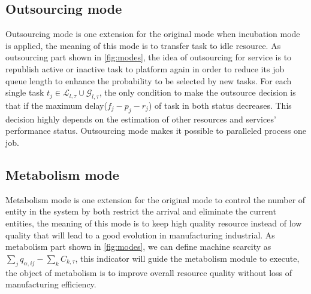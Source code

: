 



\subsection{Outsourcing mode} %
\label{sub:outsource_mode}
Outsourcing mode is one extension for the original mode when incubation mode is applied, the meaning of this mode is to transfer task to idle resource. As outsourcing part shown in \autoref{fig:modes},
the idea of outsourcing for service is to republish active or inactive task to platform again in order to reduce its job queue length to enhance the probability to be selected by new tasks. For each single task $t_j\in\mathcal{L}_{l,\tau}\cup\mathcal{G}_{l,\tau}$, the only condition to make the outsource decision is that if the maximum delay($f_j-p_j-r_j$) of task in both status decreases. This decision highly depends on the estimation of other resources and services' performance status. Outsourcing mode makes it possible to paralleled process one job.

\subsection{Metabolism mode} %
\label{sub:metabolism mode}
Metabolism mode is one extension for the original mode to control the number of entity in the system by both restrict the arrival and eliminate the current entities, the meaning of this mode is to keep high quality resource instead of low quality that will lead to a good evolution in manufacturing industrial. As metabolism part shown in \autoref{fig:modes},
we can define machine scarcity as $\sum_jq_{\alpha,ij} - \sum_kC_{k,\tau}$, this indicator will guide the metabolism module to execute, the object of metabolism is to improve overall resource quality without loss of manufacturing efficiency.

